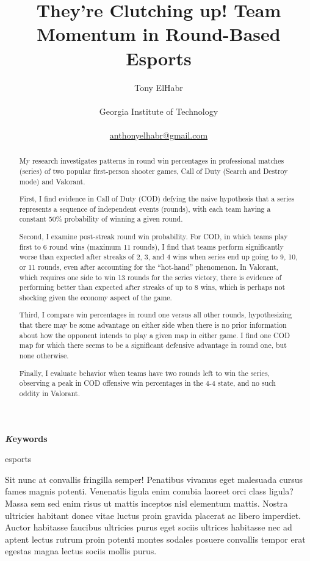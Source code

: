 \documentclass[
]{article}
\title{They're Clutching up! Team Momentum in Round-Based Esports}
\author{
Tony ElHabr\\\\Georgia Institute of
Technology\\\\\href{mailto:anthonyelhabr@gmail.com}{anthonyelhabr@gmail.com}}
\date{}
\begin{document}
\maketitle
\begin{abstract}
My research investigates patterns in round win percentages in
professional matches (series) of two popular first-person shooter games,
Call of Duty (Search and Destroy mode) and Valorant.

First, I find evidence in Call of Duty (COD) defying the naive
hypothesis that a series represents a sequence of independent events
(rounds), with each team having a constant 50\% probability of winning a
given round.

Second, I examine post-streak round win probability. For COD, in which
teams play first to 6 round wins (maximum 11 rounds), I find that teams
perform significantly worse than expected after streaks of 2, 3, and 4
wins when series end up going to 9, 10, or 11 rounds, even after
accounting for the ``hot-hand'' phenomenon. In Valorant, which requires
one side to win 13 rounds for the series victory, there is evidence of
performing better than expected after streaks of up to 8 wins, which is
perhaps not shocking given the economy aspect of the game.

Third, I compare win percentages in round one versus all other rounds,
hypothesizing that there may be some advantage on either side when there
is no prior information about how the opponent intends to play a given
map in either game. I find one COD map for which there seems to be a
significant defensive advantage in round one, but none otherwise.

Finally, I evaluate behavior when teams have two rounds left to win the
series, observing a peak in COD offensive win percentages in the 4-4
state, and no such oddity in Valorant.
\end{abstract}
{\bfseries \emph Keywords}
\def\sep{\textbullet\ }

esports

\ifdefined\Shaded\renewenvironment{Shaded}{\begin{tcolorbox}[sharp corners, frame hidden, interior hidden, borderline west={3pt}{0pt}{shadecolor}, enhanced, breakable, boxrule=0pt]}{\end{tcolorbox}}\fi

Sit nunc at convallis fringilla semper! Penatibus vivamus eget malesuada
cursus fames magnis potenti. Venenatis ligula enim conubia laoreet orci
class ligula? Massa sem sed enim risus ut mattis inceptos nisl elementum
mattis. Nostra ultricies habitant donec vitae luctus proin gravida
placerat ac libero imperdiet. Auctor habitasse faucibus ultricies purus
eget sociis ultrices habitasse nec ad aptent lectus rutrum proin potenti
montes sodales posuere convallis tempor erat egestas magna lectus sociis
mollis purus.
\end{document}
